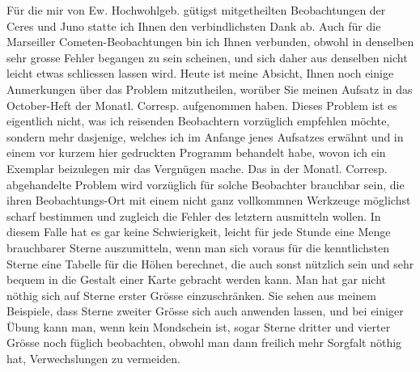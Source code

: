 \documentclass[10pt,a4paper]{article}
\begin{document}
\medskip
\noindent
Für die mir von Ew. Hochwohlgeb. gütigst mitgetheilten Beobachtungen der Ceres und Juno statte ich Ihnen den verbindlichsten Dank ab. Auch für die Marseiller Cometen-Beobachtungen bin ich Ihnen verbunden, obwohl in denselben sehr grosse Fehler begangen zu sein scheinen, und sich daher aus denselben nicht leicht etwas schliessen lassen wird. Heute ist meine Absicht, Ihnen noch einige Anmerkungen über das Problem mitzutheilen, worüber Sie meinen Aufsatz in das October-Heft der Monatl. Corresp. aufgenommen haben. Dieses Problem ist es eigentlich nicht, was ich reisenden Beobachtern vorzüglich empfehlen möchte, sondern mehr dasjenige, welches ich im Anfange jenes Aufsatzes erwähnt und in einem vor kurzem hier gedruckten Programm behandelt habe, wovon ich ein Exemplar beizulegen mir das Vergnügen mache. Das in der Monatl. Corresp. abgehandelte Problem wird vorzüglich für solche Beobachter brauchbar sein, die ihren Beobachtungs-Ort mit einem nicht ganz vollkommnen Werkzeuge möglichst scharf bestimmen und zugleich die Fehler des letztern ausmitteln wollen. In diesem Falle hat es gar keine Schwierigkeit, leicht für jede Stunde eine Menge brauchbarer Sterne auszumitteln, wenn man sich voraus für die kenntlichsten Sterne eine Tabelle für die Höhen berechnet, die auch sonst nützlich sein und sehr bequem in die Gestalt einer Karte gebracht werden kann. Man hat gar nicht nöthig sich auf Sterne erster Grösse einzuschränken. Sie sehen aus meinem Beispiele, dass Sterne zweiter Grösse sich auch anwenden lassen, und bei einiger Übung kann man, wenn kein Mondschein ist, sogar Sterne dritter und vierter Grösse noch füglich beobachten, obwohl man dann freilich mehr Sorgfalt nöthig hat, Verwechslungen zu vermeiden.
\end{document}
